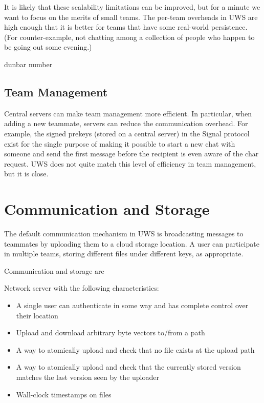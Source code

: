 \documentclass{article}
\begin{document}
It is likely that these scalability limitations can be improved, but for a minute we want to focus on the merits of small teams.
The per-team overheads in UWS are high enough that it is better for teams that have some real-world persistence.
(For counter-example, not chatting among a collection of people who happen to be going out some evening.)

dunbar number

\subsection{Team Management}

Central servers can make team management more efficient.
In particular, when adding a new teammate, servers can reduce the communication overhead.
For example, the signed prekeys (stored on a central server) in the Signal protocol exist for the single purpose of making it possible to start a new chat with someone and send the first message before the recipient is even aware of the char request.
UWS does not quite match this level of efficiency in team management, but it is close.

\section{Communication and Storage}

The default communication mechanism in UWS is broadcasting messages to teammates by uploading them to a cloud storage location.
A user can participate in multiple teams, storing different files under different keys, as appropriate.

Communication and storage are

Network server with the following characteristics:

\begin{itemize}
\item A single user can authenticate in some way and has complete control over their location
\item Upload and download arbitrary byte vectors to/from a path
\item A way to atomically upload and check that no file exists at the upload path
\item A way to atomically upload and check that the currently stored version matches the last version seen by the uploader
\item Wall-clock timestamps on files
\end{itemize}
\end{document}
